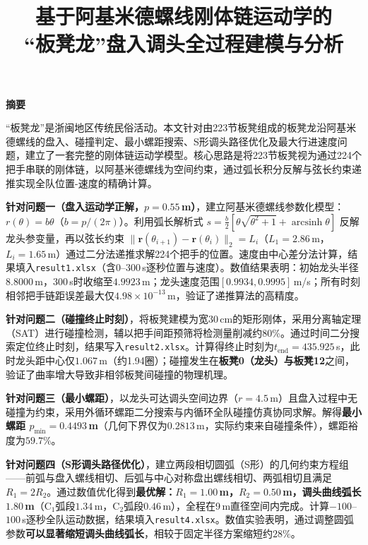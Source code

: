 \documentclass[12pt]{ctexart}
\begin{document}
\title{\textbf{基于阿基米德螺线刚体链运动学的\\[3pt]``板凳龙''盘入调头全过程建模与分析}}
\author{}
\date{}
\maketitle
\thispagestyle{empty}

\begin{center}\textbf{摘\quad 要}\end{center}

\noindent
``板凳龙''是浙闽地区传统民俗活动。本文针对由223节板凳组成的板凳龙沿阿基米德螺线的盘入、碰撞判定、最小螺距搜索、S形调头路径优化及最大行进速度问题，建立了一套完整的刚体链运动学模型。核心思路是将223节板凳视为通过224个把手串联的刚体链，以阿基米德螺线为空间约束，通过弧长积分反解与弦长约束递推实现全队位置-速度的精确计算。

\textbf{针对问题一（盘入运动学正解，$p=0.55$\,m）}，建立阿基米德螺线参数化模型：$r(\theta)=b\theta$（$b=p/(2\pi)$）。利用弧长解析式 $s=\frac{b}{2}[\theta\sqrt{\theta^2+1}+\operatorname{arcsinh}\theta]$ 反解龙头参变量，再以弦长约束 $\|\bm{r}(\theta_{i+1})-\bm{r}(\theta_i)\|_2=L_i$（$L_1=2.86$\,m，$L_i=1.65$\,m）通过二分法递推求解224个把手的位置。速度由中心差分法计算，结果填入\texttt{result1.xlsx}（含0--300\,s逐秒位置与速度）。数值结果表明：初始龙头半径$8.8000$\,m，300\,s时收缩至$4.9923$\,m；龙头速度范围$[0.9934,0.9995]$\,m/s；所有时刻相邻把手链距误差最大仅$4.98\times10^{-13}$\,m，验证了递推算法的高精度。

\textbf{针对问题二（碰撞终止时刻）}，将板凳建模为宽30\,cm的矩形刚体，采用分离轴定理（SAT）进行碰撞检测，辅以把手间距预筛将检测量削减约80\%。通过时间二分搜索定位终止时刻，结果写入\texttt{result2.xlsx}。计算得终止时刻为$t_{\text{end}}=435.925$\,s，此时龙头距中心仅$1.067$\,m（约1.94圈）；碰撞发生在\textbf{板凳0（龙头）与板凳12}之间，验证了曲率增大导致非相邻板凳间碰撞的物理机理。

\textbf{针对问题三（最小螺距）}，以龙头可达调头空间边界（$r=4.5$\,m）且盘入过程中无碰撞为约束，采用外循环螺距二分搜索与内循环全队碰撞仿真协同求解。解得\textbf{最小螺距 $p_{\min}=0.4493$\,m}（几何下界仅为$0.2813$\,m，实际约束来自碰撞条件），螺距裕度为$59.7\%$。

\textbf{针对问题四（S形调头路径优化）}，建立两段相切圆弧（S形）的几何约束方程组——前弧与盘入螺线相切、后弧与中心对称盘出螺线相切、两弧相切且满足$R_1=2R_2$。通过数值优化得到\textbf{最优解：$R_1=1.00$\,m，$R_2=0.50$\,m，调头曲线弧长$1.80$\,m}（C$_1$弧段$1.34$\,m，C$_2$弧段$0.46$\,m），全程在9\,m直径空间内完成。计算$-100$--$100$\,s逐秒全队运动数据，结果填入\texttt{result4.xlsx}。数值实验表明，通过调整圆弧参数\textbf{可以显著缩短调头曲线弧长}，相较于固定半径方案缩短约$28\%$。
\end{document}
